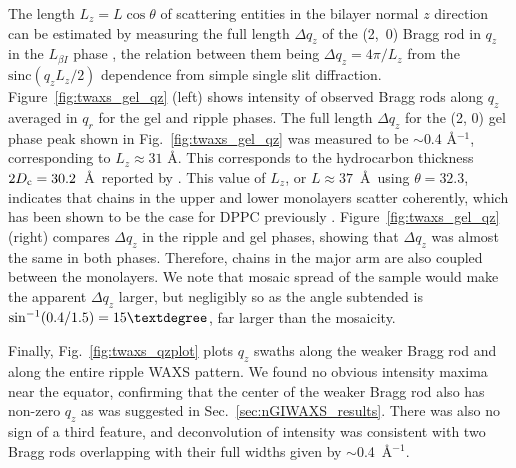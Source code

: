 The length $L_z=L\cos\theta$ of scattering entities in the bilayer normal $z$ direction can be estimated by 
measuring the full length $\Delta q_z$ of the (2,~0) Bragg rod in $q_z$ in
the $L_{\beta I}$ phase \cite{ref:Tristram93},
the relation between them being $\Delta q_z = 4\pi/L_z$ 
from the $\textrm{sinc}(q_zL_z/2)$ dependence from simple single slit 
diffraction. 
Figure~\ref{fig:twaxs_gel_qz} (left) shows intensity of observed Bragg rods along $q_z$ averaged in $q_r$
for the gel and ripple phases. The full length $\Delta q_z$ for the (2, 0) gel
phase peak shown in Fig.~\ref{fig:twaxs_gel_qz} was measured to be 
$\sim$0.4 \AA$^{-1}$, corresponding to 
$L_z \approx 31$ \AA. 
This corresponds to the hydrocarbon thickness $2D_\text{c}=30.2$~\AA\  
reported by \cite{Tristram-Nagle02}. 
This value of $L_z$, or $L\approx 37$~\AA\ using $\theta=32.3$\textdegree,
indicates that chains in the upper and
lower monolayers scatter coherently, which has been shown to be the case
for DPPC previously \cite{ref:Tristram93}.
Figure~\ref{fig:twaxs_gel_qz} (right) compares $\Delta q_z$ in the ripple and gel phases,
showing that $\Delta q_z$ was almost the same in both phases. Therefore, 
chains in the major arm are also coupled between the monolayers. 
We note that mosaic spread of the sample would make the apparent $\Delta q_z$ 
larger, but negligibly so as the angle subtended is $\sin^{-1}(0.4/1.5)=15\textdegree$, 
far larger than the mosaicity.

Finally, Fig.~\ref{fig:twaxs_qzplot} plots $q_z$ swaths along the weaker 
Bragg rod and along the entire ripple WAXS pattern. 
We found no obvious intensity maxima
near the equator, confirming that the center of the weaker Bragg rod also 
has non-zero $q_z$ as was suggested in Sec.~\ref{sec:nGIWAXS_results}.
There was also no sign of a third feature, and deconvolution of intensity
was consistent with two Bragg rods overlapping 
with their full widths given by $\sim$0.4~\AA$^{-1}$.

